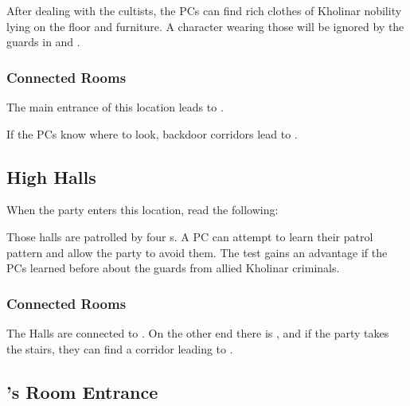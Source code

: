 After dealing with the cultists, the PCs can find rich clothes of Kholinar nobility lying on the floor and furniture. A character wearing those will be ignored by the guards in  and .

\subsubsection{Connected Rooms}

The main entrance of this location leads to .

If the PCs know where to look, backdoor corridors lead to .




\subsection{High Halls}
\label{ssec:kholinarPalaceRoomsHighHalls}

When the party enters this location, read the following:


Those halls are patrolled by four \enemyQueensGuard{}s. A PC can attempt  to learn their patrol pattern and allow the party to avoid them. The test gains an advantage if the PCs learned before about the guards from allied Kholinar criminals.

\subsubsection{Connected Rooms}

The Halls are connected to . On the other end there is , and if the party takes the stairs, they can find a corridor leading to .




\subsection{\npcGavinorName{}'s Room Entrance}
\label{ssec:kholinarPalaceRoomsGavinorEntrance}

